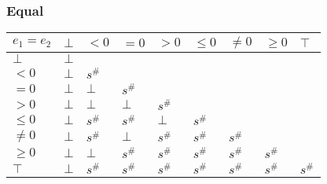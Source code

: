 \documentclass{beamer}
\begin{document}
        \begin{frame}
            \frametitle{Equal}
\begin{table}
    \begin{tabular}{|l|l|l|l|l|l|l|l|l|}
    \hline
    $e_1 = e_2$ & $\bot$ & $<0$   & $=0$   & $>0$   & $\le 0$ & $\ne 0$ & $\ge 0$ & $\top$ \\ \hline
    $\bot$      & $\bot$ &        &        &        &         &         &         &        \\ \hline
    $<0$        & $\bot$ & $s^\#$ &        &        &         &         &         &        \\ \hline
    $=0$        & $\bot$ & $\bot$ & $s^\#$ &        &         &         &         &        \\ \hline
    $>0$        & $\bot$ & $\bot$ & $\bot$ & $s^\#$ &         &         &         &        \\ \hline
    $\le 0$     & $\bot$ & $s^\#$ & $s^\#$ & $\bot$ & $s^\#$  &         &         &        \\ \hline
    $\ne 0$     & $\bot$ & $s^\#$ & $\bot$ & $s^\#$ & $s^\#$  & $s^\#$  &         &        \\ \hline
    $\ge 0$     & $\bot$ & $\bot$ & $s^\#$ & $s^\#$ & $s^\#$  & $s^\#$  & $s^\#$  &        \\ \hline
    $\top$      & $\bot$ & $s^\#$ & $s^\#$ & $s^\#$ & $s^\#$  & $s^\#$  & $s^\#$  & $s^\#$ \\ \hline
    \end{tabular}
    \end{table}
\end{frame}
\end{document}
